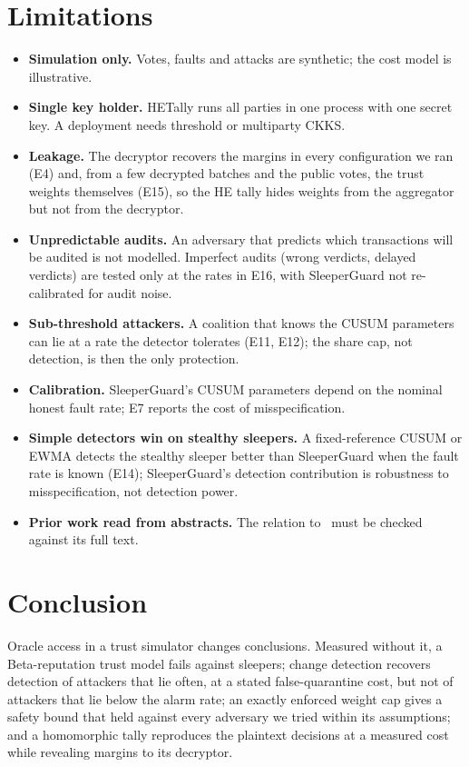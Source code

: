 \documentclass[conference]{IEEEtran}
\begin{document}
\section{Limitations}
\begin{itemize}
\item \textbf{Simulation only.} Votes, faults and attacks are synthetic; the cost model is illustrative.
\item \textbf{Single key holder.} HETally runs all parties in one process with one secret key. A deployment
needs threshold or multiparty CKKS.
\item \textbf{Leakage.} The decryptor recovers the margins in every configuration we ran (E4) and, from a few
decrypted batches and the public votes, the trust weights themselves (E15), so the HE tally hides weights from the
aggregator but not from the decryptor.
\item \textbf{Unpredictable audits.} An adversary that predicts which transactions will be audited is not modelled.
Imperfect audits (wrong verdicts, delayed verdicts) are tested only at the rates in E16, with SleeperGuard not
re-calibrated for audit noise.
\item \textbf{Sub-threshold attackers.} A coalition that knows the CUSUM parameters can lie at a rate the
detector tolerates (E11, E12); the share cap, not detection, is then the only protection.
\item \textbf{Calibration.} SleeperGuard's CUSUM parameters depend on the nominal honest fault rate; E7 reports
the cost of misspecification.
\item \textbf{Simple detectors win on stealthy sleepers.} A fixed-reference CUSUM or EWMA detects the stealthy sleeper
better than SleeperGuard when the fault rate is known (E14); SleeperGuard's detection contribution is robustness to
misspecification, not detection power.
\item \textbf{Prior work read from abstracts.} The relation to~\cite{muniswamy2025trust} must be checked
against its full text.
\end{itemize}

\section{Conclusion}
Oracle access in a trust simulator changes conclusions. Measured without it, a Beta-reputation trust model
fails against sleepers; change detection recovers detection of attackers that lie often, at a stated
false-quarantine cost, but not of attackers that lie below the alarm rate; an exactly enforced weight cap gives a
safety bound that held against every adversary we tried within its assumptions; and a homomorphic tally
reproduces the plaintext decisions at a measured cost while revealing margins to its decryptor.



\end{document}
